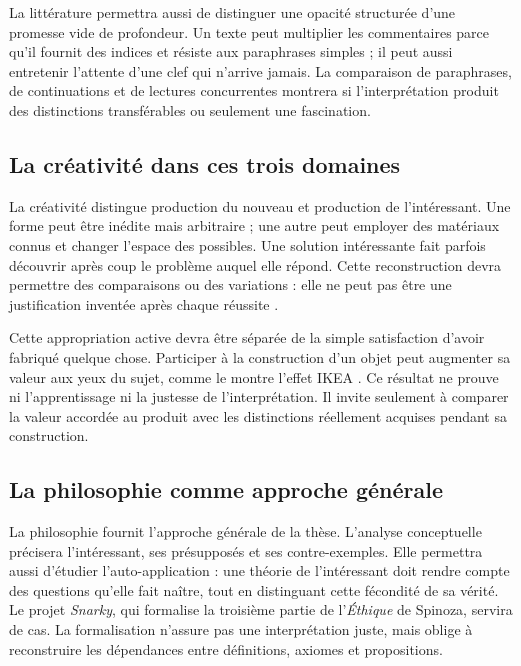 \documentclass[11pt,a4paper]{article}
\begin{document}
La littérature permettra aussi de distinguer une opacité structurée d'une
promesse vide de profondeur. Un texte peut multiplier les commentaires parce
qu'il fournit des indices et résiste aux paraphrases simples ; il peut aussi
entretenir l'attente d'une clef qui n'arrive jamais. La comparaison de
paraphrases, de continuations et de lectures concurrentes montrera si
l'interprétation produit des distinctions transférables ou seulement une
fascination.

\subsection{La créativité dans ces trois domaines}

La créativité distingue production du nouveau et production de l'intéressant.
Une forme peut être inédite mais arbitraire ; une autre peut employer des
matériaux connus et changer l'espace des possibles. Une solution intéressante
fait parfois découvrir après coup le problème auquel elle répond. Cette
reconstruction devra permettre des comparaisons ou des variations : elle ne
peut pas être une justification inventée après chaque réussite
\parencite{pachet2026impossibilite}.

Cette appropriation active devra être séparée de la simple satisfaction d'avoir
fabriqué quelque chose. Participer à la construction d'un objet peut augmenter
sa valeur aux yeux du sujet, comme le montre l'effet IKEA
\parencite{norton2012ikea}. Ce résultat ne prouve ni l'apprentissage ni la
justesse de l'interprétation. Il invite seulement à comparer la valeur accordée
au produit avec les distinctions réellement acquises pendant sa construction.

\subsection{La philosophie comme approche générale}

La philosophie fournit l'approche générale de la thèse. L'analyse conceptuelle
précisera l'intéressant, ses présupposés et ses contre-exemples. Elle permettra
aussi d'étudier l'auto-application : une théorie de l'intéressant doit rendre
compte des questions qu'elle fait naître, tout en distinguant cette fécondité de
sa vérité. Le projet \emph{Snarky}, qui formalise la troisième partie de
l'\emph{Éthique} de Spinoza, servira de cas. La formalisation n'assure pas une
interprétation juste, mais oblige à reconstruire les dépendances entre
définitions, axiomes et propositions.
\end{document}

